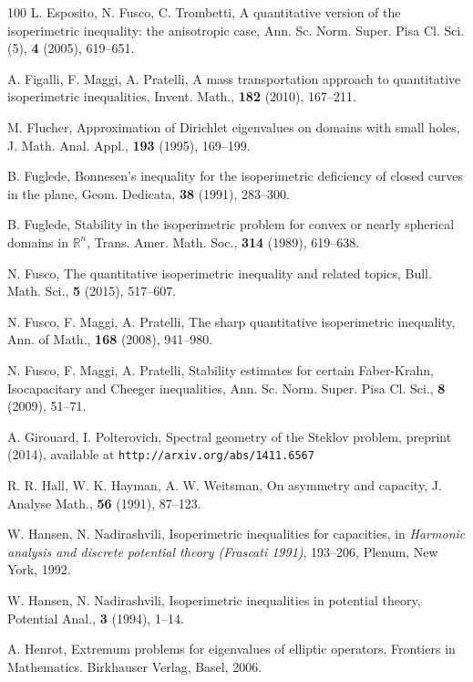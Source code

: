 \documentclass{amsart}
\theoremstyle{definition}
\numberwithin{equation}{section}
\begin{document}
\begin{thebibliography}{100}
 L. Esposito, N. Fusco, C. Trombetti, A quantitative version of the isoperimetric inequality: the anisotropic case, Ann. Sc. Norm. Super. Pisa Cl. Sci. (5), {\bf 4} (2005), 619--651. 

 A. Figalli, F. Maggi, A. Pratelli, A mass transportation approach to quantitative isoperimetric inequalities, Invent. Math., {\bf 182} (2010),  167--211.

 M. Flucher, Approximation of Dirichlet eigenvalues on domains with small holes, J. Math. Anal. Appl., {\bf 193} (1995), 169--199. 

 B. Fuglede, Bonnesen's inequality for the isoperimetric deficiency of closed curves in the plane, Geom. Dedicata, {\bf 38} (1991), 283--300.

 B. Fuglede, Stability in the isoperimetric problem for convex or nearly spherical domains in $\mathbb{R}^n$, Trans. Amer. Math. Soc., {\bf 314} (1989), 619--638.

 N. Fusco, The quantitative isoperimetric inequality and related topics, Bull. Math. Sci., {\bf 5} (2015), 517--607.

 N. Fusco, F. Maggi, A. Pratelli, The sharp quantitative isoperimetric inequality, Ann. of Math., {\bf 168}  (2008),  941--980.

 N. Fusco, F. Maggi, A. Pratelli, Stability estimates for certain Faber-Krahn, Isocapacitary and Cheeger inequalities, Ann. Sc. Norm. Super. Pisa Cl. Sci., {\bf 8}  (2009), 51--71.

 A. Girouard, I. Polterovich, Spectral geometry of the Steklov problem, preprint (2014), available at {\tt http://arxiv.org/abs/1411.6567}

 R. R. Hall, W. K. Hayman, A. W. Weitsman, On asymmetry and capacity, J. Analyse Math., {\bf 56} (1991), 87--123.

 W. Hansen, N. Nadirashvili, Isoperimetric inequalities for capacities, in {\it Harmonic analysis and discrete potential theory (Frascati 1991)}, 193--206, Plenum, New York, 1992.

 W. Hansen, N. Nadirashvili, Isoperimetric inequalities in potential theory, Potential Anal., {\bf 3} (1994), 1--14.

 A. Henrot, Extremum problems for eigenvalues of elliptic operators. Frontiers in Mathematics. Birkhauser Verlag, Basel, 2006.


\end{thebibliography}
\end{document}
